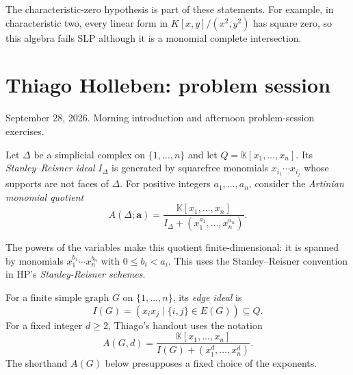 \begin{remark}
\label{remark-characteristic}
The characteristic-zero hypothesis is
part of these statements.
For example, in characteristic two,
every linear form in $K[x,y]/(x^2,y^2)$
has square zero, so this algebra fails
SLP although it is a monomial complete
intersection.
\end{remark}

\section{Thiago Holleben: problem session}
\label{section-thiago-problems}

September 28, 2026.
Morning introduction and afternoon
problem-session exercises.

\begin{definition}
\label{definition-monomial-quotient}
Let $\Delta$ be a simplicial complex on
$\{1,\ldots,n\}$ and let
$Q=\mathbb{K}[x_1,\ldots,x_n]$.
Its \emph{Stanley--Reisner ideal}
$I_\Delta$ is generated by squarefree
monomials $x_{i_1}\cdots x_{i_j}$ whose
supports are not faces of $\Delta$.
For positive integers $a_1,\ldots,a_n$,
consider the \emph{Artinian monomial
quotient}
$$
A(\Delta;\mathbf{a})=
\frac{\mathbb{K}[x_1,\ldots,x_n]}
{I_\Delta+(x_1^{a_1},\ldots,x_n^{a_n})}.
$$
\end{definition}

The powers of the variables make this
quotient finite-dimensional: it is spanned
by monomials $x_1^{b_1}\cdots x_n^{b_n}$
with $0\leq b_i<a_i$.
This uses the Stanley--Reisner convention
in HP's \emph{Stanley-Reisner schemes}.

\begin{definition}
\label{definition-edge-ideal}
For a finite simple graph $G$ on
$\{1,\ldots,n\}$, its \emph{edge ideal}
is
$$
I(G)=(x_ix_j\mid\{i,j\}\in E(G))
\subseteq Q.
$$
For a fixed integer $d\geq2$, Thiago's
handout uses the notation
$$
A(G,d)=\frac{\mathbb{K}[x_1,\ldots,x_n]}
{I(G)+(x_1^d,\ldots,x_n^d)}.
$$
The shorthand $A(G)$ below presupposes a
fixed choice of the exponents.
\end{definition}

